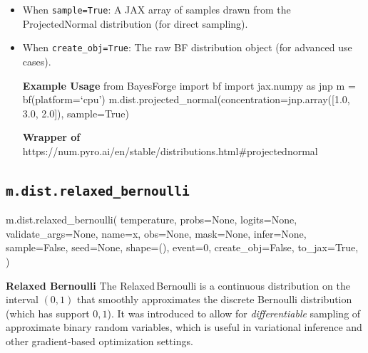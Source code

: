 \documentclass[
  letterpaper,
  DIV=11,
  numbers=noendperiod]{scrartcl}
\newenvironment{Shaded}{\begin{snugshade}}{\end{snugshade}}
\newcommand{\DecValTok}[1]{\textcolor[rgb]{0.68,0.00,0.00}{#1}}
\newcommand{\NormalTok}[1]{\textcolor[rgb]{0.00,0.23,0.31}{#1}}
\newcommand{\OperatorTok}[1]{\textcolor[rgb]{0.37,0.37,0.37}{#1}}
\newcommand{\StringTok}[1]{\textcolor[rgb]{0.13,0.47,0.30}{#1}}
\newcommand{\VariableTok}[1]{\textcolor[rgb]{0.07,0.07,0.07}{#1}}
\begin{document}
\begin{itemize}
\item
  When \texttt{sample=True}: A JAX array of samples drawn from the
  ProjectedNormal distribution (for direct sampling).
\item
  When \texttt{create\_obj=True}: The raw BF distribution object (for
  advanced use cases).

  \textbf{Example Usage} from BayesForge import bf import jax.numpy as
  jnp m = bf(platform=`cpu')
  m.dist.projected\_normal(concentration=jnp.array({[}1.0, 3.0, 2.0{]}),
  sample=True)

  \textbf{Wrapper of}
  https://num.pyro.ai/en/stable/distributions.html\#projectednormal
\end{itemize}

\subsection{\texorpdfstring{\texttt{m.dist.relaxed\_bernoulli}}{m.dist.relaxed\_bernoulli}}\label{relaxed_bernoulli}

\begin{Shaded}
\begin{Highlighting}[]
\NormalTok{m.dist.relaxed\_bernoulli(}
\NormalTok{    temperature,}
\NormalTok{    probs}\OperatorTok{=}\VariableTok{None}\NormalTok{,}
\NormalTok{    logits}\OperatorTok{=}\VariableTok{None}\NormalTok{,}
\NormalTok{    validate\_args}\OperatorTok{=}\VariableTok{None}\NormalTok{,}
\NormalTok{    name}\OperatorTok{=}\StringTok{\textquotesingle{}x\textquotesingle{}}\NormalTok{,}
\NormalTok{    obs}\OperatorTok{=}\VariableTok{None}\NormalTok{,}
\NormalTok{    mask}\OperatorTok{=}\VariableTok{None}\NormalTok{,}
\NormalTok{    infer}\OperatorTok{=}\VariableTok{None}\NormalTok{,}
\NormalTok{    sample}\OperatorTok{=}\VariableTok{False}\NormalTok{,}
\NormalTok{    seed}\OperatorTok{=}\VariableTok{None}\NormalTok{,}
\NormalTok{    shape}\OperatorTok{=}\NormalTok{(),}
\NormalTok{    event}\OperatorTok{=}\DecValTok{0}\NormalTok{,}
\NormalTok{    create\_obj}\OperatorTok{=}\VariableTok{False}\NormalTok{,}
\NormalTok{    to\_jax}\OperatorTok{=}\VariableTok{True}\NormalTok{,}
\NormalTok{)}
\end{Highlighting}
\end{Shaded}

\textbf{Relaxed Bernoulli} The Relaxed\,Bernoulli is a continuous
distribution on the interval \((0,1)\) that smoothly approximates the
discrete Bernoulli distribution (which has support \({0,1}\)). It was
introduced to allow for \emph{differentiable} sampling of approximate
binary random variables, which is useful in variational inference and
other gradient‐based optimization settings.
\end{document}

